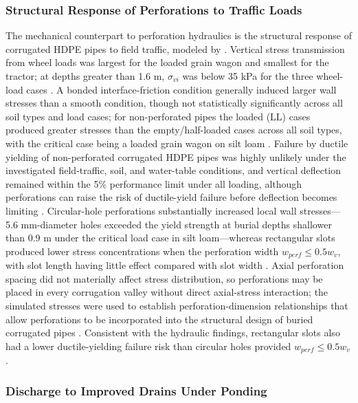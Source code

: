 \subsubsection{Structural Response of Perforations to Traffic Loads}

The mechanical counterpart to perforation hydraulics is the structural response of
corrugated HDPE pipes to field traffic, modeled by \textcite{Gaj2021}. Vertical stress
transmission from wheel loads was largest for the loaded grain wagon and smallest for the
tractor; at depths greater than 1.6 m, $\sigma_{vi}$ was below 35 kPa for the three
wheel-load cases \parencite{Gaj2021}. A bonded interface-friction condition generally
induced larger wall stresses than a smooth condition, though not statistically
significantly across all soil types and load cases; for non-perforated pipes the loaded
(LL) cases produced greater stresses than the empty/half-loaded cases across all soil
types, with the critical case being a loaded grain wagon on silt loam \parencite{Gaj2021}.
Failure by ductile yielding of non-perforated corrugated HDPE pipes was highly unlikely
under the investigated field-traffic, soil, and water-table conditions, and vertical
deflection remained within the 5\% performance limit under all loading, although
perforations can raise the risk of ductile-yield failure before deflection becomes
limiting \parencite{Gaj2021}. Circular-hole perforations substantially increased local
wall stresses---5.6 mm-diameter holes exceeded the yield strength at burial depths
shallower than 0.9 m under the critical load case in silt loam---whereas rectangular slots
produced lower stress concentrations when the perforation width $w_{perf} \le 0.5 w_v$,
with slot length having little effect compared with slot width \parencite{Gaj2021}. Axial
perforation spacing did not materially affect stress distribution, so perforations may be
placed in every corrugation valley without direct axial-stress interaction; the simulated
stresses were used to establish perforation-dimension relationships that allow perforations
to be incorporated into the structural design of buried corrugated pipes
\parencite{Gaj2021}. Consistent with the hydraulic findings, rectangular slots also had a
lower ductile-yielding failure risk than circular holes provided $w_{perf} \le 0.5 w_v$
\parencite{Gaj2021}.

\subsubsection{Discharge to Improved Drains Under Ponding}

